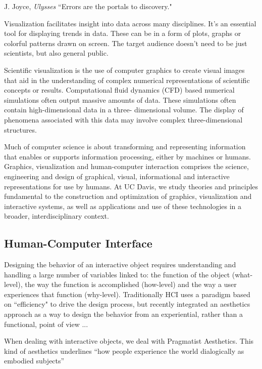 \begin{chapquote}{J. Joyce, \textit{Ulysses}}
	``Errors are the portals to discovery."
\end{chapquote}

Visualization facilitates insight into data across many disciplines. It's an essential tool for displaying trends in data. These can be in a form of plots, graphs or colorful patterns drawn on screen. The target audience doesn't need to be just scientists, but also general public. 

Scientific visualization is the use of computer graphics to create visual images that aid in the understanding of complex numerical representations of scientific concepts or results. Computational fluid dynamics (CFD) based numerical simulations often output massive amounts of data. These simulations often contain high-dimensional data in a three- dimensional volume. The display of phenomena associated with this data may involve complex three-dimensional structures.
%

Much of computer science is about transforming and representing information that enables or supports information processing, either by machines or humans. Graphics, visualization and human-computer interaction comprises the science, engineering and design of graphical, visual, informational and interactive representations for use by humans. At UC Davis, we study theories and principles fundamental to the construction and optimization of graphics, visualization and interactive systems, as well as applications and use of these technologies in a broader, interdisciplinary context.
%

\subsection{Human-Computer Interface}

Designing the behavior of an interactive object requires understanding and handling a large number of variables linked to: the function of the object (what-level), the way the function is accomplished (how-level) and the way a user experiences that function (why-level). Traditionally HCI uses a paradigm based on ``efficiency" to drive the design process, but recently integrated an aesthetics approach as a way to design the behavior from an experiential, rather than a functional, point of view ...  \citep{spadaforaDesigningBehaviorInteractive2016}

When dealing with interactive objects, we deal with Pragmatist Aesthetics. This kind of aesthetics underlines “how people experience the world dialogically as embodied subjects”

